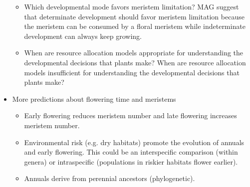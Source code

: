 \documentclass[12pt, oneside,titlepage]{article}   	%
\begin{document}
\begin{itemize}
\begin{itemize}
\item Which developmental mode favors meristem limitation? MAG suggest that determinate development should favor meristem limitation because the meristem can be consumed by a floral meristem while indeterminate development can always keep growing.

\item When are resource allocation models appropriate for understanding the developmental decisions that plants make? When are resource allocation models insufficient for understanding the developmental decisions that plants make?




\end{itemize}

\item More predictions about flowering time and meristems
\begin{itemize}
\item Early flowering reduces meristem number and late flowering increases meristem number. 
\item Environmental risk (e.g. dry habitats) promote the evolution of annuals and early flowering. This could be an interspecific comparison (within genera) or intraspecific (populations in riskier habitats flower earlier). 
\item Annuals derive from perennial ancestors (phylogenetic).
\end{itemize}

\end{itemize}
\doublespace
\end{document}
